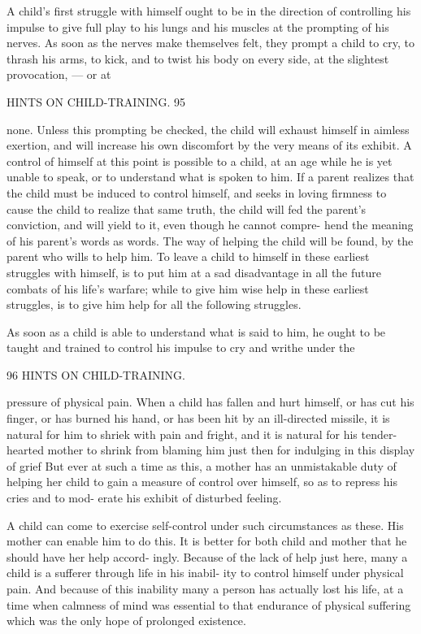 \documentclass[
]{book}
\begin{document}
A child's first struggle with himself ought to be in the direction of controlling his impulse to give full play to his lungs and his muscles at the prompting of his nerves. As soon as the nerves make themselves felt, they prompt a child to cry, to thrash his arms, to kick, and to twist his body on every side, at the slightest provocation, --- or at

HINTS ON CHILD-TRAINING. 95

none. Unless this prompting be checked, the child will exhaust himself in aimless exertion, and will increase his own discomfort by the very means of its exhibit. A control of himself at this point is possible to a child, at an age while he is yet unable to speak, or to understand what is spoken to him. If a parent realizes that the child must be induced to control himself, and seeks in loving firmness to cause the child to realize that same truth, the child will fed the parent's conviction, and will yield to it, even though he cannot compre- hend the meaning of his parent's words as words. The way of helping the child will be found, by the parent who wills to help him. To leave a child to himself in these earliest struggles with himself, is to put him at a sad disadvantage in all the future combats of his life's warfare; while to give him wise help in these earliest struggles, is to give him help for all the following struggles.

As soon as a child is able to understand what is said to him, he ought to be taught and trained to control his impulse to cry and writhe under the

96 HINTS ON CHILD-TRAINING.

pressure of physical pain. When a child has fallen and hurt himself, or has cut his finger, or has burned his hand, or has been hit by an ill-directed missile, it is natural for him to shriek with pain and fright, and it is natural for his tender-hearted mother to shrink from blaming him just then for indulging in this display of grief But ever at such a time as this, a mother has an unmistakable duty of helping her child to gain a measure of control over himself, so as to repress his cries and to mod- erate his exhibit of disturbed feeling.

A child can come to exercise self-control under such circumstances as these. His mother can enable him to do this. It is better for both child and mother that he should have her help accord- ingly. Because of the lack of help just here, many a child is a sufferer through life in his inabil- ity to control himself under physical pain. And because of this inability many a person has actually lost his life, at a time when calmness of mind was essential to that endurance of physical suffering which was the only hope of prolonged existence.
\end{document}
